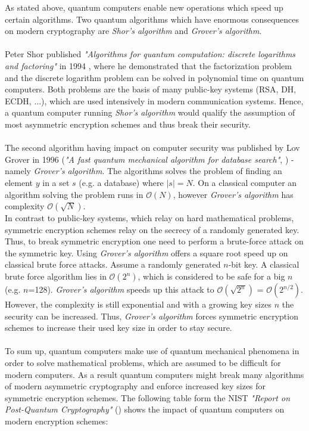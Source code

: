 As stated above, quantum computers enable new operations which speed up certain algorithms. Two quantum algorithms which have enormous consequences on modern cryptography are \textit{Shor's algorithm} and \textit{Grover's algorithm}. \parencite{nielsen2002quantum}
\\\\
Peter Shor published \textit{"Algorithms for quantum computation: discrete logarithms and factoring"} in 1994 \parencite{shor1994algorithms}, where he demonstrated that the factorization problem and the discrete logarithm problem can be solved in polynomial time on quantum computers. Both problems are the basis of many public-key systems (RSA, DH, ECDH, ...), which are used intensively in modern communication systems. Hence, a quantum computer running \textit{Shor's algorithm} would qualify the assumption of most asymmetric encryption schemes and thus break their security.
\\\\
The second algorithm having impact on computer security was published by Lov Grover in 1996 (\textit{"A fast quantum mechanical algorithm for database search"}, \parencite{grover1996fast}) - namely \textit{Grover's algorithm}. The algorithms solves the problem of finding an element $y$ in a set $s$ (e.g. a database) where $|s| = N$. On a classical computer an algorithm solving the problem runs in $\mathcal{O}(N)$, however \textit{Grover's algorithm} has complexity $\mathcal{O}(\sqrt{N})$. \parencite{nielsen2002quantum}\\
In contrast to public-key systems, which relay on hard mathematical problems, symmetric encryption schemes relay on the secrecy of a randomly generated key. 
Thus, to break symmetric encryption one need to perform a brute-force attack on the symmetric key. Using \textit{Grover's algorithm} offers a square root speed up on classical brute force attacks. Assume a randomly generated $n$-bit key. A classical brute force algorithm lies in $\mathcal{O}(2^n)$, which is considered to be safe for a big $n$ (e.g. $n$=128). \textit{Grover's algorithm} speeds up this attack to $\mathcal{O}(\sqrt{2^n})$ = $\mathcal{O}(2^{n/2})$. \parencite{mavroeidis2018impact} However, the complexity is still exponential and with a growing key sizes $n$ the security can be increased. Thus, \textit{Grover's algorithm} forces symmetric encryption schemes to increase their used key size in order to stay secure.
\\\\
To sum up, quantum computers make use of quantum mechanical phenomena in order to solve mathematical problems, which are assumed to be difficult for modern computers. As a result quantum computers might break many algorithms of modern asymmetric cryptography and enforce increased key sizes for symmetric encryption schemes. The following table form the NIST \textit{"Report on Post-Quantum Cryptography"} (\parencite{chen2016report}) shows the impact of quantum computers on modern encryption schemes:

